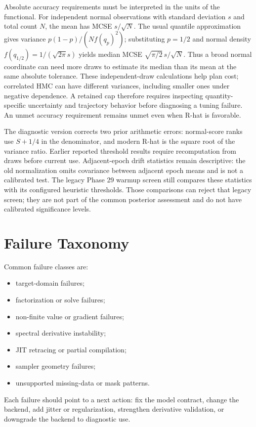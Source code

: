 Absolute accuracy requirements must be interpreted in the units of the
functional. For independent normal observations with standard deviation $s$
and total count $N$, the mean has MCSE $s/\sqrt N$. The usual quantile
approximation gives variance $p(1-p)/(N f(q_p)^2)$; substituting $p=1/2$
and normal density $f(q_{1/2})=1/(\sqrt{2\pi}s)$ yields median MCSE
$\sqrt{\pi/2}\,s/\sqrt N$. Thus a broad normal coordinate can need more
draws to estimate its median than its mean at the same absolute tolerance.
These independent-draw calculations help plan cost; correlated HMC can have
different variances, including smaller ones under negative dependence.
A retained cap therefore requires inspecting quantity-specific uncertainty
and trajectory behavior before diagnosing a tuning failure. An unmet accuracy
requirement remains unmet even when R-hat is favorable.

The diagnostic version  corrects two
prior arithmetic errors: normal-score ranks use $S+1/4$ in the denominator,
and modern R-hat is the square root of the variance ratio. Earlier reported
threshold results require recomputation from draws before current use.
Adjacent-epoch drift statistics remain descriptive: the old normalization
omits covariance between adjacent epoch means and is not a calibrated test.
The legacy Phase 29 warmup screen still compares these statistics with its
configured heuristic thresholds. Those comparisons can reject that legacy
screen; they are not part of the common posterior assessment and do not have
calibrated significance levels.



\section{Failure Taxonomy}
\label{sec:bf-failure-taxonomy}

Common failure classes are:
\begin{itemize}
  \item target-domain failures;
  \item factorization or solve failures;
  \item non-finite value or gradient failures;
  \item spectral derivative instability;
  \item JIT retracing or partial compilation;
  \item sampler geometry failures;
  \item unsupported missing-data or mask patterns.
\end{itemize}
Each failure should point to a next action: fix the model contract, change the
backend, add jitter or regularization, strengthen derivative validation, or
downgrade the backend to diagnostic use.

